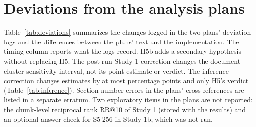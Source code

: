 \documentclass[11pt]{article}
\begin{document}
\FloatBarrier



\appendix
\section{Deviations from the analysis plans}\label{app:deviations}
Table~\ref{tab:deviations} summarizes the changes logged in the two plans' deviation logs and the differences between the plans' text and the implementation. The timing column reports what the logs record. H5b adds a secondary hypothesis without replacing H5. The post-run Study 1 correction changes the document-cluster sensitivity interval, not its point estimate or verdict. The inference correction changes estimates by at most \InferenceShiftMax{} percentage points and only H5's verdict (Table~\ref{tab:inference}). Section-number errors in the plans' cross-references are listed in a separate erratum. Two exploratory items in the plans are not reported: the chunk-level reciprocal rank RR@10 of Study 1 (stored with the results) and an optional answer check for S5-256 in Study 1b, which was not run.
\end{document}

